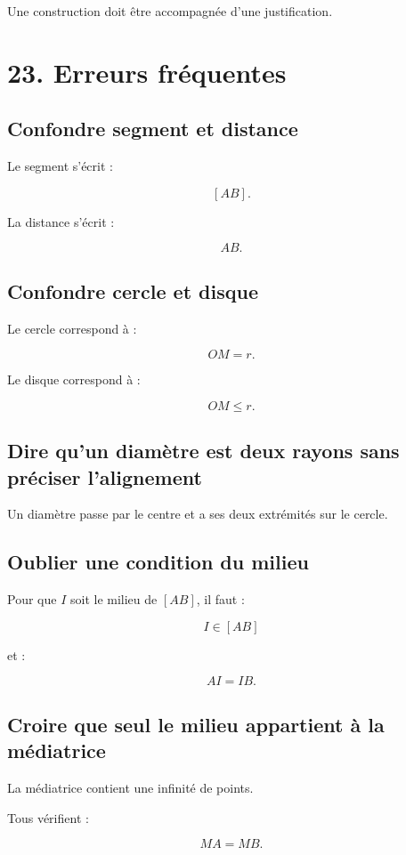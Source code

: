 Une construction doit être accompagnée d’une justification.

\section{23. Erreurs fréquentes}

\subsection{Confondre segment et distance}

Le segment s’écrit :

\[
[AB].
\]

La distance s’écrit :

\[
AB.
\]

\subsection{Confondre cercle et disque}

Le cercle correspond à :

\[
OM=r.
\]

Le disque correspond à :

\[
OM\le r.
\]

\subsection{Dire qu’un diamètre est deux rayons sans préciser l’alignement}

Un diamètre passe par le centre et a ses deux extrémités sur le cercle.

\subsection{Oublier une condition du milieu}

Pour que $I$ soit le milieu de $[AB]$, il faut :

\[
I\in[AB]
\]

et :

\[
AI=IB.
\]

\subsection{Croire que seul le milieu appartient à la médiatrice}

La médiatrice contient une infinité de points.

Tous vérifient :

\[
MA=MB.
\]


